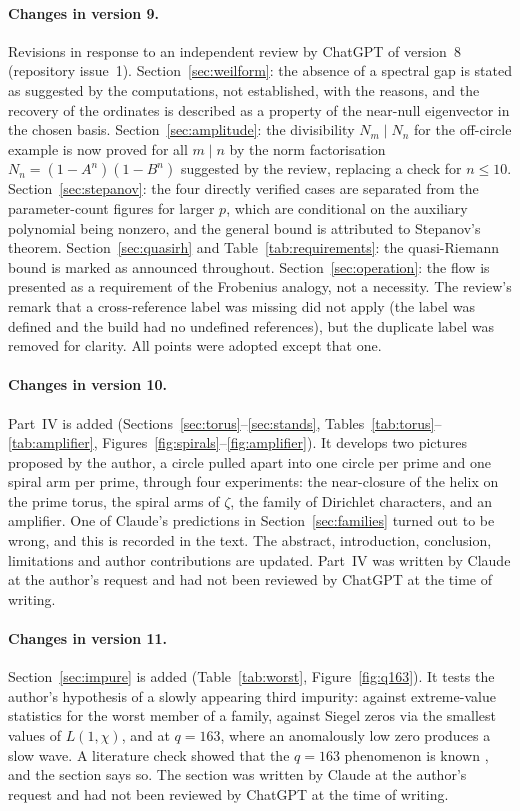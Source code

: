 \documentclass[11pt,a4paper]{article}
\theoremstyle{definition}\newtheorem{definition}[proposition]{Definition}
\theoremstyle{remark}\newtheorem{remark}[proposition]{Remark}
\begin{document}
\paragraph{Changes in version 9.} Revisions in response to an independent review by ChatGPT of version~8 (repository issue~1). Section~\ref{sec:weilform}: the absence of a spectral gap is stated as suggested by the computations, not established, with the reasons, and the recovery of the ordinates is described as a property of the near-null eigenvector in the chosen basis. Section~\ref{sec:amplitude}: the divisibility $N_m\mid N_n$ for the off-circle example is now proved for all $m\mid n$ by the norm factorisation $N_n=(1-A^n)(1-B^n)$ suggested by the review, replacing a check for $n\le10$. Section~\ref{sec:stepanov}: the four directly verified cases are separated from the parameter-count figures for larger $p$, which are conditional on the auxiliary polynomial being nonzero, and the general bound is attributed to Stepanov's theorem. Section~\ref{sec:quasirh} and Table~\ref{tab:requirements}: the quasi-Riemann bound is marked as announced throughout. Section~\ref{sec:operation}: the flow is presented as a requirement of the Frobenius analogy, not a necessity. The review's remark that a cross-reference label was missing did not apply (the label was defined and the build had no undefined references), but the duplicate label was removed for clarity. All points were adopted except that one.

\paragraph{Changes in version 10.} Part~IV is added (Sections~\ref{sec:torus}--\ref{sec:stands}, Tables~\ref{tab:torus}--\ref{tab:amplifier}, Figures~\ref{fig:spirals}--\ref{fig:amplifier}). It develops two pictures proposed by the author, a circle pulled apart into one circle per prime and one spiral arm per prime, through four experiments: the near-closure of the helix on the prime torus, the spiral arms of $\zeta$, the family of Dirichlet characters, and an amplifier. One of Claude's predictions in Section~\ref{sec:families} turned out to be wrong, and this is recorded in the text. The abstract, introduction, conclusion, limitations and author contributions are updated. Part~IV was written by Claude at the author's request and had not been reviewed by ChatGPT at the time of writing.

\paragraph{Changes in version 11.} Section~\ref{sec:impure} is added (Table~\ref{tab:worst}, Figure~\ref{fig:q163}). It tests the author's hypothesis of a slowly appearing third impurity: against extreme-value statistics for the worst member of a family, against Siegel zeros via the smallest values of $L(1,\chi)$, and at $q=163$, where an anomalously low zero produces a slow wave. A literature check showed that the $q=163$ phenomenon is known \cite{BFHR2001}, and the section says so. The section was written by Claude at the author's request and had not been reviewed by ChatGPT at the time of writing.
\end{document}
